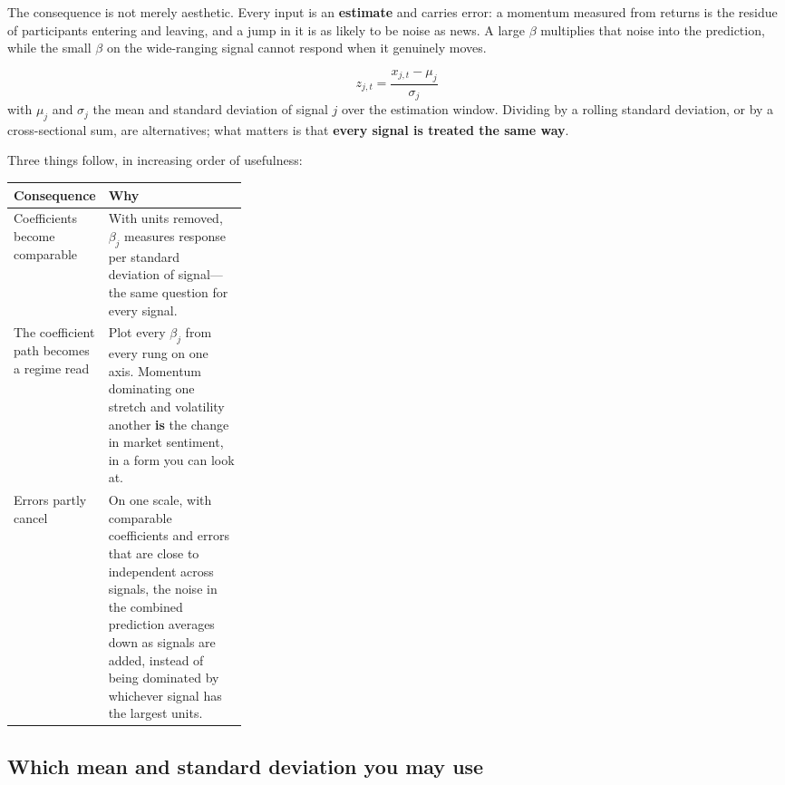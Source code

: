 The consequence is not merely aesthetic. Every input is an \textbf{estimate} and carries error: a
momentum measured from returns is the residue of participants entering and leaving, and a jump in
it is as likely to be noise as news. A large $\beta$ multiplies that noise into the prediction,
while the small $\beta$ on the wide-ranging signal cannot respond when it genuinely moves.

\begin{definition}\label{def:zscore}
\[
  z_{j,t} = \frac{x_{j,t} - \mu_j}{\sigma_j}
\]
with $\mu_j$ and $\sigma_j$ the mean and standard deviation of signal $j$ over the estimation
window. Dividing by a rolling standard deviation, or by a cross-sectional sum, are alternatives;
what matters is that \textbf{every signal is treated the same way}.
\end{definition}


Three things follow, in increasing order of usefulness:

\begin{tabularx}{\linewidth}{|>{\raggedright\arraybackslash}p{0.30\linewidth}|X|}
\hline
\textbf{Consequence} & \textbf{Why} \\ \hline
Coefficients become comparable
  & With units removed, $\beta_j$ measures response per standard deviation of signal---the same
    question for every signal. \\ \hline
The coefficient path becomes a regime read
  & Plot every $\beta_j$ from every rung on one axis. Momentum dominating one stretch and
    volatility another \textbf{is} the change in market sentiment, in a form you can look at. \\ \hline
Errors partly cancel
  & On one scale, with comparable coefficients and errors that are close to independent across
    signals, the noise in the combined prediction averages down as signals are added, instead of
    being dominated by whichever signal has the largest units. \\ \hline
\end{tabularx}

\subsection{Which mean and standard deviation you may use}\label{sec:which-stats}

